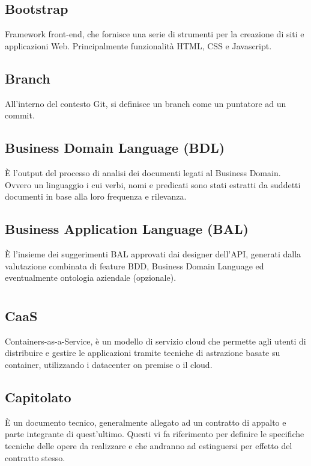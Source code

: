 	\subsection*{Bootstrap}
	Framework front-end, che fornisce una serie di strumenti per la creazione di siti e applicazioni Web. Principalmente funzionalità HTML, CSS e Javascript.
	\subsection*{Branch}
	All’interno del contesto Git, si definisce un branch come un puntatore ad un commit.
	\subsection*{Business Domain Language (BDL)}
	È l'output del processo di analisi dei documenti legati al Business Domain. Ovvero un linguaggio i cui verbi, nomi e predicati sono stati estratti da suddetti documenti in base alla loro frequenza e rilevanza.
	\subsection*{Business Application Language (BAL)}
	È l’insieme dei suggerimenti BAL approvati dai designer dell’API, generati dalla valutazione combinata di feature BDD, Business Domain Language ed eventualmente ontologia aziendale (opzionale).
\pagebreak
\section[C]{}
	\subsection*{CaaS}
	Containers-as-a-Service, è un modello di servizio cloud che permette agli utenti di distribuire e gestire le applicazioni tramite tecniche di astrazione basate su container, utilizzando i datacenter on premise o il cloud.
	\subsection*{Capitolato}
	È un documento tecnico, generalmente allegato ad un contratto di appalto e parte integrante di quest’ultimo. Questi vi fa riferimento per definire le specifiche tecniche delle opere da realizzare e che andranno ad estinguersi per effetto del contratto stesso.
